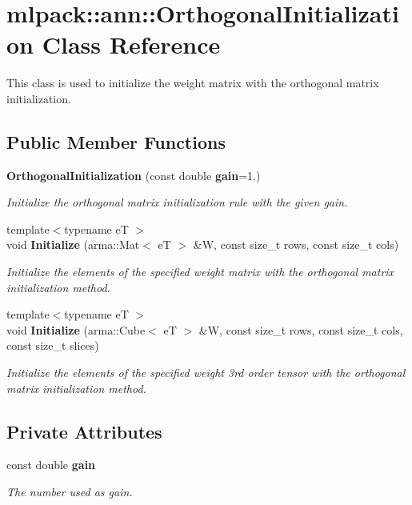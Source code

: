 \section{mlpack\+:\+:ann\+:\+:Orthogonal\+Initialization Class Reference}
\label{classmlpack_1_1ann_1_1OrthogonalInitialization}


This class is used to initialize the weight matrix with the orthogonal matrix initialization.  


\subsection*{Public Member Functions}
\begin{DoxyCompactItemize}
\item 
{\bf Orthogonal\+Initialization} (const double {\bf gain}=1.)
\begin{DoxyCompactList}\small\item\em Initialize the orthogonal matrix initialization rule with the given gain. \end{DoxyCompactList}\item 
{\footnotesize template$<$typename eT $>$ }\\void {\bf Initialize} (arma\+::\+Mat$<$ eT $>$ \&W, const size\+\_\+t rows, const size\+\_\+t cols)
\begin{DoxyCompactList}\small\item\em Initialize the elements of the specified weight matrix with the orthogonal matrix initialization method. \end{DoxyCompactList}\item 
{\footnotesize template$<$typename eT $>$ }\\void {\bf Initialize} (arma\+::\+Cube$<$ eT $>$ \&W, const size\+\_\+t rows, const size\+\_\+t cols, const size\+\_\+t slices)
\begin{DoxyCompactList}\small\item\em Initialize the elements of the specified weight 3rd order tensor with the orthogonal matrix initialization method. \end{DoxyCompactList}\end{DoxyCompactItemize}
\subsection*{Private Attributes}
\begin{DoxyCompactItemize}
\item 
const double {\bf gain}
\begin{DoxyCompactList}\small\item\em The number used as gain. \end{DoxyCompactList}\end{DoxyCompactItemize}


